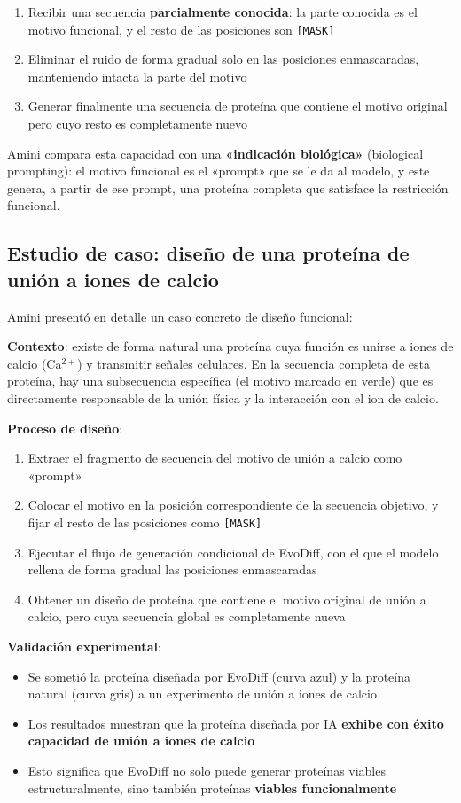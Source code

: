 \begin{enumerate}
    \item Recibir una secuencia \textbf{parcialmente conocida}: la parte conocida es el motivo funcional, y el resto de las posiciones son \texttt{[MASK]}
    \item Eliminar el ruido de forma gradual solo en las posiciones enmascaradas, manteniendo intacta la parte del motivo
    \item Generar finalmente una secuencia de proteína que contiene el motivo original pero cuyo resto es completamente nuevo
\end{enumerate}

Amini compara esta capacidad con una \textbf{«indicación biológica»} (biological prompting): el motivo funcional es el «prompt» que se le da al modelo, y este genera, a partir de ese prompt, una proteína completa que satisface la restricción funcional.

\subsection{Estudio de caso: diseño de una proteína de unión a iones de calcio}

Amini presentó en detalle un caso concreto de diseño funcional:

\textbf{Contexto}: existe de forma natural una proteína cuya función es unirse a iones de calcio (Ca$^{2+}$) y transmitir señales celulares. En la secuencia completa de esta proteína, hay una subsecuencia específica (el motivo marcado en verde) que es directamente responsable de la unión física y la interacción con el ion de calcio.

\textbf{Proceso de diseño}:
\begin{enumerate}
    \item Extraer el fragmento de secuencia del motivo de unión a calcio como «prompt»
    \item Colocar el motivo en la posición correspondiente de la secuencia objetivo, y fijar el resto de las posiciones como \texttt{[MASK]}
    \item Ejecutar el flujo de generación condicional de EvoDiff, con el que el modelo rellena de forma gradual las posiciones enmascaradas
    \item Obtener un diseño de proteína que contiene el motivo original de unión a calcio, pero cuya secuencia global es completamente nueva
\end{enumerate}

\textbf{Validación experimental}:
\begin{itemize}
    \item Se sometió la proteína diseñada por EvoDiff (curva azul) y la proteína natural (curva gris) a un experimento de unión a iones de calcio
    \item Los resultados muestran que la proteína diseñada por IA \textbf{exhibe con éxito capacidad de unión a iones de calcio}
    \item Esto significa que EvoDiff no solo puede generar proteínas viables estructuralmente, sino también proteínas \textbf{viables funcionalmente}
\end{itemize}

